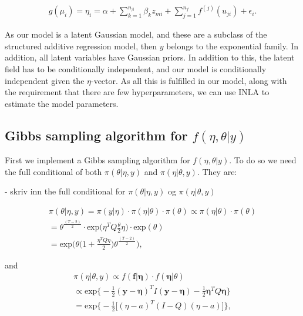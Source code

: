 \begin{equation} 
\begin{split}
    g(\mu_i) = \eta_i = \alpha + \sum_{k = 1}^{n_\beta} \beta_k z_{mi} + \sum_{j = 1}^{n_f}f^{(j)}(u_{ji}) + \epsilon_i.
\end{split}
\end{equation}

As our model is a latent Gaussian model, and these are a subclass of the structured additive regression model, then $y$ belongs to the exponential family. In addition, all latent variables have Gaussian priors. In addition to this, the latent field has to be conditionally independent, and our model is conditionally independent given the $\eta$-vector. As all this is fulfilled in our model, along with the requirement that there are few hyperparameters, we can use INLA to estimate the model parameters. 




\subsection{Gibbs sampling algorithm for $f(\eta, \theta |y)$}
\label{Gibbs}

First we implement a Gibbs sampling algorithm for $f(\eta, \theta |y)$. To do so we need the full conditional of both $\pi(\theta|\eta, y)$ and $\pi(\eta|\theta, y)$. They are:

- skriv inn the full conditional for $\pi(\theta|\eta, y)$ og $\pi(\eta|\theta, y)$

\begin{align}
    \pi(\theta| \eta, y) = \pi(y|\eta) \cdot \pi(\eta|\theta) \cdot \pi(\theta) \propto \pi(\eta|\theta) \cdot \pi(\theta) \nonumber \\
    = \theta^{\frac{(T-2)}{2}} \cdot \text{exp} \Big( \eta^T Q \frac{\theta}{2} \eta \Big) \cdot \text{exp}(\theta) \nonumber \\
    = \text{exp} \Big(  \theta \big(1 + \frac{\eta^T Q \eta}{2}  \big) \theta^{\frac{(T-2)}{2}}  \Big), 
\end{align}

and 
\begin{align}
    \pi(\eta | \theta, y) \propto f(\mathbf{f}|\mathbf{\eta}) \cdot f(\mathbf{\eta}|\theta) \nonumber \\
    \propto \text{exp} \Bigg\{ -\frac{1}{2}(\mathbf{y} - \mathbf{\eta})^T I (\mathbf{y}-\mathbf{\eta}) - \frac{1}{2} \mathbf{\eta}^T Q \mathbf{\eta} \Bigg\} \nonumber \\
    = \text{exp} \Bigg\{  -\frac{1}{2} \Big[ (\eta - a)^T (I - Q) (\eta - a) \Big] \Bigg\}, 
\end{align}

